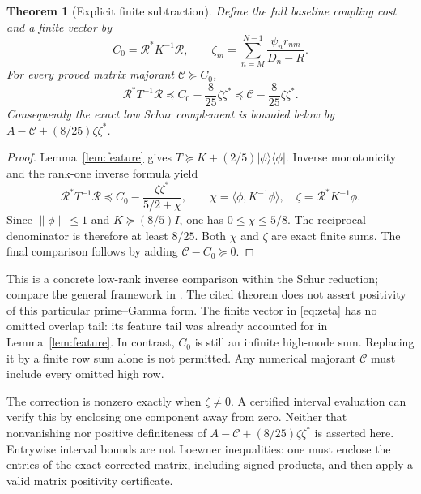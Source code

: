 \documentclass[11pt]{article}
\newtheorem{theorem}{Theorem}
\newcommand{\norm}[1]{\lVert#1\rVert}
\newcommand{\ip}[2]{\langle#1,#2\rangle}
\newcommand{\RR}{\mathcal R}
\begin{document}
\begin{theorem}[Explicit finite subtraction]\label{thm:schur}
Define the full baseline coupling cost and a finite vector by
\begin{equation}
 C_0=\RR^*K^{-1}\RR,\qquad
 \zeta_m=\sum_{n=M}^{N-1}\frac{\psi_n r_{nm}}{D_n-R}.
 \label{eq:zeta}
\end{equation}
For every proved matrix majorant $\mathcal C\succeq C_0$,
\begin{equation}
 \RR^*T^{-1}\RR\preceq C_0-\frac8{25}\zeta\zeta^*
 \preceq\mathcal C-\frac8{25}\zeta\zeta^*.
 \label{eq:main}
\end{equation}
Consequently the exact low Schur complement is bounded below by
$A-\mathcal C+(8/25)\zeta\zeta^*$.
\end{theorem}
\begin{proof}
Lemma~\ref{lem:feature} gives $T\succeq K+(2/5)|\phi\rangle\langle\phi|$. Inverse monotonicity and the rank-one inverse formula yield
\[
 \RR^*T^{-1}\RR\preceq C_0-
 \frac{\zeta\zeta^*}{5/2+\chi},\qquad
 \chi=\ip\phi{K^{-1}\phi},\quad \zeta=\RR^*K^{-1}\phi.
\]
Since $\norm\phi\le1$ and $K\succeq(8/5)I$, one has $0\le\chi\le5/8$. The reciprocal denominator is therefore at least $8/25$. Both $\chi$ and $\zeta$ are exact finite sums. The final comparison follows by adding $\mathcal C-C_0\succeq0$.
\end{proof}

This is a concrete low-rank inverse comparison within the Schur reduction; compare the general framework in \cite[Theorem 1.2]{DSS}. The cited theorem does not assert positivity of this particular prime--Gamma form. The finite vector in \eqref{eq:zeta} has no omitted overlap tail: its feature tail was already accounted for in Lemma~\ref{lem:feature}. In contrast, $C_0$ is still an infinite high-mode sum. Replacing it by a finite row sum alone is not permitted. Any numerical majorant $\mathcal C$ must include every omitted high row.

The correction is nonzero exactly when $\zeta\ne0$. A certified interval evaluation can verify this by enclosing one component away from zero. Neither that nonvanishing nor positive definiteness of $A-\mathcal C+(8/25)\zeta\zeta^*$ is asserted here. Entrywise interval bounds are not Loewner inequalities: one must enclose the entries of the exact corrected matrix, including signed products, and then apply a valid matrix positivity certificate.
\end{document}
